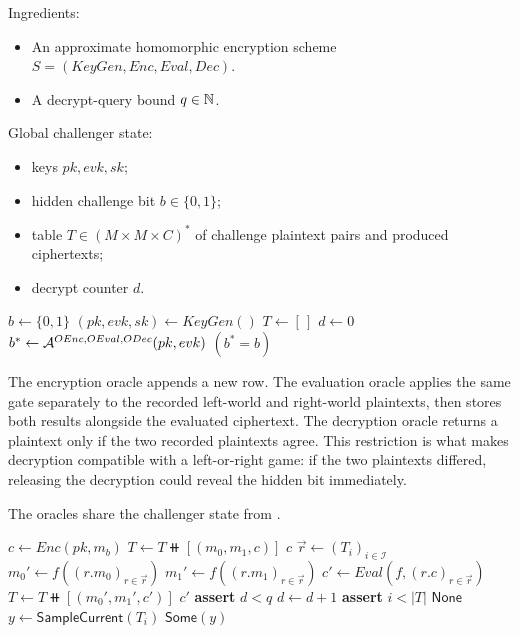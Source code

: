 \begin{algorithm}
\caption{IND-CPAD Challenger Skeleton}
\label{alg:ind-cpad-game}
Ingredients:
\begin{itemize}
  \item An approximate homomorphic encryption scheme
    $S=(KeyGen,Enc,Eval,Dec)$.
  \item A decrypt-query bound $q\in\mathbb{N}$.
\end{itemize}
Global challenger state:
\begin{itemize}
  \item keys $pk,evk,sk$;
  \item hidden challenge bit $b\in\{0,1\}$;
  \item table $T\in(M\times M\times C)^*$ of challenge plaintext pairs and
    produced ciphertexts;
  \item decrypt counter $d$.
\end{itemize}
\begin{algorithmic}
    \State $b \gets \{0,1\}$
    \State $(pk,evk,sk) \gets KeyGen()$
    \State $T \gets [\,]$
    \State $d \gets 0$
    \State $b^* \gets \mathcal{A}^{OEnc,OEval,ODec}(pk,evk)$
    \State \Return $(b^*=b)$
  \EndProcedure
\end{algorithmic}
\end{algorithm}

The encryption oracle appends a new row.
The evaluation oracle applies the same gate separately to the recorded
left-world and right-world plaintexts, then stores both results alongside the
evaluated ciphertext.
The decryption oracle returns a plaintext only if the two recorded plaintexts
agree.
This restriction is what makes decryption compatible with a left-or-right
game: if the two plaintexts differed, releasing the decryption could reveal
the hidden bit immediately.

\begin{algorithm}
\caption{IND-CPAD Oracles}
\label{alg:ind-cpad-oracles}
The oracles share the challenger state from .
\begin{algorithmic}
    \State $c \gets Enc(pk,m_b)$
    \State $T \gets T \doubleplus [(m_0,m_1,c)]$
    \State \Return $c$
  \EndProcedure
  \State
    \State $\vec r \gets (T_i)_{i\in\mathcal{I}}$
    \State $m_0' \gets f((r.m_0)_{r\in\vec r})$
    \State $m_1' \gets f((r.m_1)_{r\in\vec r})$
    \State $c' \gets Eval(f,(r.c)_{r\in\vec r})$
    \State $T \gets T \doubleplus [(m_0',m_1',c')]$
    \State \Return $c'$
  \EndProcedure
  \State
    \State \textbf{assert} $d<q$
    \State $d \gets d+1$
    \State \textbf{assert} $i<|T|$
      \State \Return $\mathsf{None}$
    \Else
      \State $y\gets\mathsf{SampleCurrent}(T_i)$
      \State \Return $\mathsf{Some}(y)$
    \EndIf
  \EndProcedure
\end{algorithmic}
\end{algorithm}

